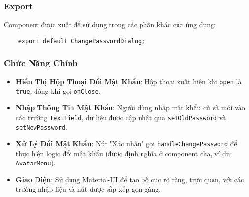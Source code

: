             \subsubsection{Export}
                \hspace*{0.6cm}Component được xuất để sử dụng trong các phần khác của ứng dụng:
                \begin{lstlisting}
    export default ChangePasswordDialog;
                \end{lstlisting}

            \subsubsection{Chức Năng Chính}
                \begin{itemize}
                    \item \textbf{Hiển Thị Hộp Thoại Đổi Mật Khẩu}: Hộp thoại xuất hiện khi \texttt{open} là \texttt{true}, đóng khi gọi \texttt{onClose}.
                    \item \textbf{Nhập Thông Tin Mật Khẩu}: Người dùng nhập mật khẩu cũ và mới vào các trường \texttt{TextField}, dữ liệu được cập nhật qua \texttt{setOldPassword} và \texttt{setNewPassword}.
                    \item \textbf{Xử Lý Đổi Mật Khẩu}: Nút "Xác nhận" gọi \texttt{handleChangePassword} để thực hiện logic đổi mật khẩu (được định nghĩa ở component cha, ví dụ: \texttt{AvatarMenu}).
                    \item \textbf{Giao Diện}: Sử dụng Material-UI để tạo bố cục rõ ràng, trực quan, với các trường nhập liệu và nút được sắp xếp gọn gàng.
                \end{itemize}

